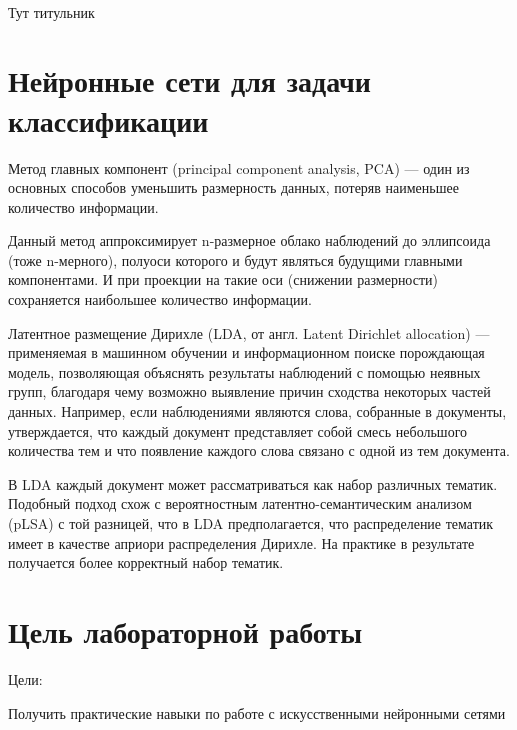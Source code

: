 \documentclass[a4paper,12pt]{article}
\begin{document}
\begin{titlepage}
\newpage

\

Тут титульник
\end{titlepage}

\newpage
\tableofcontents
\setcounter{page}{2}


\newpage\section{Нейронные сети для задачи классификации} 
	Метод главных компонент (principal component analysis, PCA) — один из основных способов уменьшить размерность данных, потеряв наименьшее количество информации. 
	
	\vspace{0.5cm}
	Данный метод аппроксимирует n-размерное облако наблюдений до эллипсоида (тоже n-мерного), полуоси которого и будут являться будущими главными компонентами. И при проекции на такие оси (снижении размерности) сохраняется наибольшее количество информации. 
	
	\vspace{0.5cm}
	Латентное размещение Дирихле (LDA, от англ. Latent Dirichlet allocation) — применяемая в машинном обучении и информационном поиске порождающая модель, позволяющая объяснять результаты наблюдений с помощью неявных групп, благодаря чему возможно выявление причин сходства некоторых частей данных. Например, если наблюдениями являются слова, собранные в документы, утверждается, что каждый документ представляет собой смесь небольшого количества тем и что появление каждого слова связано с одной из тем документа. 
	
	\vspace{0.5cm}
	В LDA каждый документ может рассматриваться как набор различных тематик. Подобный подход схож с вероятностным латентно-семантическим анализом (pLSA) с той разницей, что в LDA предполагается, что распределение тематик имеет в качестве априори распределения Дирихле. На практике в результате получается более корректный набор тематик.

	

\newpage\section{Цель лабораторной работы} 
	Цели: 
	\vspace{0.5cm}
	
	Получить практические навыки по работе с искусственными нейронными сетями
	
\end{document}
